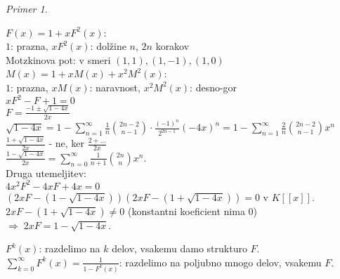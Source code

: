 \documentclass[a4paper, 12pt]{book}
\theoremstyle{definition}
\theoremstyle{remark}
\newtheorem*{ex}{Primer}
\begin{document}
\begin{ex}
\begin{enumerate}[label=(\arabic*)]
      $F(x) = 1 + x F^2(x)$: \\
      $1$: prazna, $xF^2(x)$: dolžine $n$, $2n$ korakov \\
      Motzkinova pot: v smeri $(1,1), (1,-1), (1,0)$ \\
      $M(x) = 1 + x M(x) + x^2 M^2(x)$: \\
      $1$: prazna, $x M(x)$: naravnost, $x^2 M^2(x)$: desno-gor \\
      $x F^2 - F + 1 = 0$ \\
      $F = \frac{-1 \pm \sqrt{1-4x}}{2x}$ \\
      $\sqrt{1-4x} = 1 - \sum_{n=1}^{\infty} \frac{1}{n} \binom{2n-2}{n-1} \cdot \frac{(-1)^n}{2^{2n-1}} (-4x)^n
        = 1 - \sum_{n=1}^{\infty} \frac{2}{n} \binom{2n-2}{n-1} x^n$ \\
      $\frac{1+\sqrt{1-4x}}{2x}$ - ne, ker $\frac{2 + \dots}{2x}$ \\
      $\frac{1-\sqrt{1-4x}}{2x} = \sum_{n=0}^{\infty} \frac{1}{n+1} \binom{2n}{n} x^n$. \\
      Druga utemeljitev: \\
      $4 x^2 F^2 - 4 x F + 4 x = 0$ \\
      $(2xF - \left(1-\sqrt{1-4x}\right)) (2xF - \left(1+\sqrt{1-4x}\right)) = 0$ v $K[[x]]$. \\
      $2xF - \left(1+\sqrt{1-4x}\right) \neq 0$ (konstantni koeficient nima $0$) \\
      $\Longrightarrow \; 2 x F = 1 - \sqrt{1-4x}$.
  \end{enumerate}
\end{ex}
$F^k(x)$: razdelimo na $k$ delov, vsakemu damo strukturo $F$. \\
$\sum_{k=0}^{\infty} F^k(x) = \frac{1}{1-F^k(x)}$: razdelimo na poljubno mnogo delov, vsakemu $F$.
\end{document}
